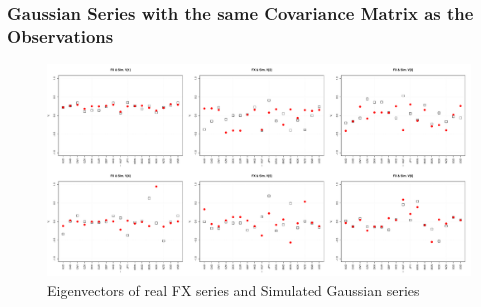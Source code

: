 \documentclass{beamer}
\begin{document}
\begin{frame}
  \frametitle{Gaussian Series with the same Covariance Matrix as the
    Observations}
  \begin{figure}[htb!]
    \centering
    \includegraphics[width=1.0\linewidth]{Gaussian_eigenvectors.pdf}
    \caption{\scriptsize Eigenvectors of real FX series and Simulated Gaussian series}
  \end{figure}
\end{frame}
\end{document}
